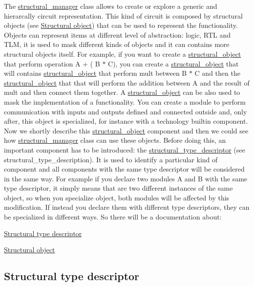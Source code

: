 The \hyperlink{classstructural__manager}{structural\+\_\+manager} class allows to create or explore a generic and hierarcally circuit representation. This kind of circuit is composed by structural objects (see \hyperlink{src_circuit_page_structural_object_description}{Structural object}) that can be used to represent the functionality. Objects can represent items at different level of abstraction\+: logic, R\+TL and T\+LM, it is used to mask different kinds of objects and it can contains more structural objects itself. For example, if you want to create a \hyperlink{classstructural__object}{structural\+\_\+object} that perform operation A + ( B $\ast$ C), you can create a \hyperlink{classstructural__object}{structural\+\_\+object} that will contains \hyperlink{classstructural__object}{structural\+\_\+object} that perform mult between B $\ast$ C and then the \hyperlink{classstructural__object}{structural\+\_\+object} that that will perform the addition between A and the result of mult and then connect them together. A \hyperlink{classstructural__object}{structural\+\_\+object} can be also used to mask the implementation of a functionality. You can create a module to perform communication with inputs and outputs defined and connected outside and, only after, this object is specialized, for instance with a technology builtin component. Now we shortly describe this \hyperlink{classstructural__object}{structural\+\_\+object} component and then we could see how \hyperlink{classstructural__manager}{structural\+\_\+manager} class can use these objects. Before doing this, an important component has to be introduced\+: the \hyperlink{structstructural__type__descriptor}{structural\+\_\+type\+\_\+descriptor} (see structural\+\_\+type\+\_\+description). It is used to identify a particular kind of component and all components with the same type descriptor will be considered in the same way. For example if you declare two modules A and B with the same type descriptor, it simply means that are two different instances of the same object, so when you specialize object, both modules will be affected by this modification. If instead you declare them with different type descriptors, they can be specialized in different ways. So there will be a documentation about\+:
\begin{DoxyItemize}
\item \hyperlink{src_circuit_page_structural_type_description_doc}{Structural type descriptor}
\item \hyperlink{src_circuit_page_structural_object_description}{Structural object}
\end{DoxyItemize}\hypertarget{src_circuit_page_structural_type_description_doc}{}\subsection{Structural type descriptor}\label{src_circuit_page_structural_type_description_doc}
